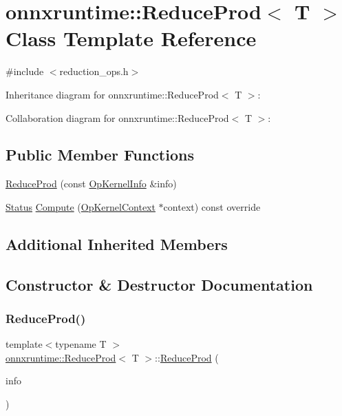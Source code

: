 \hypertarget{classonnxruntime_1_1ReduceProd}{}\section{onnxruntime\+:\+:Reduce\+Prod$<$ T $>$ Class Template Reference}
\label{classonnxruntime_1_1ReduceProd}


{\ttfamily \#include $<$reduction\+\_\+ops.\+h$>$}



Inheritance diagram for onnxruntime\+:\+:Reduce\+Prod$<$ T $>$\+:


Collaboration diagram for onnxruntime\+:\+:Reduce\+Prod$<$ T $>$\+:
\subsection*{Public Member Functions}
\begin{DoxyCompactItemize}
\item 
\mbox{\hyperlink{classonnxruntime_1_1ReduceProd_a44bda513cf48067de8e1b884870e8400}{Reduce\+Prod}} (const \mbox{\hyperlink{classonnxruntime_1_1OpKernelInfo}{Op\+Kernel\+Info}} \&info)
\item 
\mbox{\hyperlink{classonnxruntime_1_1common_1_1Status}{Status}} \mbox{\hyperlink{classonnxruntime_1_1ReduceProd_a1f4a5053a81337797ba478085ffd780d}{Compute}} (\mbox{\hyperlink{classonnxruntime_1_1OpKernelContext}{Op\+Kernel\+Context}} $\ast$context) const override
\end{DoxyCompactItemize}
\subsection*{Additional Inherited Members}


\subsection{Constructor \& Destructor Documentation}
\mbox{\label{classonnxruntime_1_1ReduceProd_a44bda513cf48067de8e1b884870e8400}} 
\subsubsection{\texorpdfstring{Reduce\+Prod()}{ReduceProd()}}
{\footnotesize\ttfamily template$<$typename T $>$ \\
\mbox{\hyperlink{classonnxruntime_1_1ReduceProd}{onnxruntime\+::\+Reduce\+Prod}}$<$ T $>$\+::\mbox{\hyperlink{classonnxruntime_1_1ReduceProd}{Reduce\+Prod}} (\begin{DoxyParamCaption}\item[{const \mbox{\hyperlink{classonnxruntime_1_1OpKernelInfo}{Op\+Kernel\+Info}} \&}]{info }\end{DoxyParamCaption})\hspace{0.3cm}{\ttfamily [inline]}}



